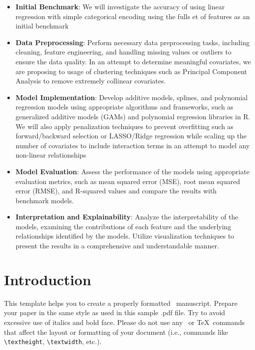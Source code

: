 \documentclass[aoas]{imsart}
\numberwithin{equation}{section}
\theoremstyle{plain}
\theoremstyle{remark}
\begin{document}
\begin{itemize}
\item
  \textbf{Initial Benchmark}: We will investigate the accuracy of using
  linear regression with simple categorical encoding using the fulls et
  of features as an initial benchmark
\item
  \textbf{Data Preprocessing}: Perform necessary data preprocessing
  tasks, including cleaning, feature engineering, and handling missing
  values or outliers to ensure the data quality. In an attempt to
  determine meaningful covariates, we are proposing to usage of
  clustering techniques such as Principal Component Analysis to remove
  extremely collinear covariates.
\item
  \textbf{Model Implementation}: Develop additive models, splines, and
  polynomial regression models using appropriate algorithms and
  frameworks, such as generalized additive models (GAMs) and polynomial
  regression libraries in R. We will also apply penalization techniques
  to prevent overfitting such as forward/backward selection or
  LASSO/Ridge regression while scaling up the number of covariates to
  include interaction terms in an attempt to model any non-linear
  relationships
\item
  \textbf{Model Evaluation}: Assess the performance of the models using
  appropriate evaluation metrics, such as mean squared error (MSE), root
  mean squared error (RMSE), and R-squared values and compare the
  results with benchmark models.
\item
  \textbf{Interpretation and Explainability}: Analyze the
  interpretability of the models, examining the contributions of each
  feature and the underlying relationships identified by the models.
  Utilize visualization techniques to present the results in a
  comprehensive and understandable manner.
\end{itemize}

\newpage
\newpage

\hypertarget{introduction}{%
\section{Introduction}\label{introduction}}

This template helps you to create a properly formatted
\LaTeXe~manuscript. Prepare your paper in the same style as used in this
sample .pdf file. Try to avoid excessive use of italics and bold face.
Please do not use any \LaTeXe~or \TeX~commands that affect the layout or
formatting of your document (i.e., commands like \verb|\textheight|,
\verb|\textwidth|, etc.).
\end{document}
